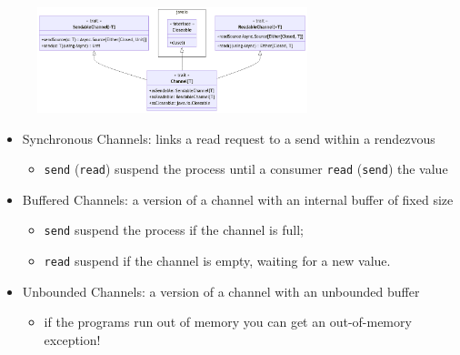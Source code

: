\documentclass[aspectratio=1610,xcolor=dvipsnames,handout]{beamer}
\begin{document}
\begin{frame}  
  \begin{figure}
    \centering
    \includegraphics[width=0.7\textwidth]{./images/channels-uml.png}
  \end{figure}
  \begin{itemize}
      \item Synchronous Channels: links a read request to a send within a rendezvous
      \begin{itemize}
          \item \texttt{send} (\texttt{read}) suspend the process until a consumer \texttt{read} (\texttt{send}) the value
      \end{itemize}
      \item Buffered Channels: a version of a channel with an internal buffer of fixed size
      \begin{itemize}
          \item \texttt{send} suspend the process if the channel is full;
          \item \texttt{read} suspend if the channel is empty, waiting for a new value.
      \end{itemize}
      \item Unbounded Channels: a version of a channel with an unbounded buffer
      \begin{itemize}
          \item if the programs run out of memory you can get an out-of-memory exception!
      \end{itemize}
  \end{itemize}
\end{frame}
%
\end{document}
